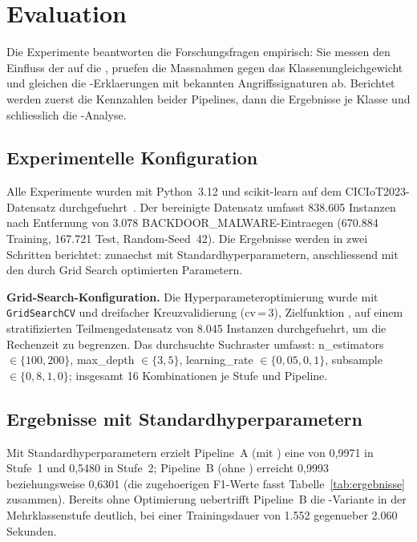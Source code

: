 \section{Evaluation}\label{evaluation}

Die Experimente beantworten die Forschungsfragen empirisch: Sie messen den Einfluss der \pca{}
auf die \ba{}, pruefen die Massnahmen gegen das Klassenungleichgewicht und gleichen die
\shap{}-Erklaerungen mit bekannten Angriffssignaturen ab.
Berichtet werden zuerst die Kennzahlen beider Pipelines, dann die Ergebnisse je Klasse und
schliesslich die \shap{}-Analyse.

\subsection{Experimentelle Konfiguration}

Alle Experimente wurden mit Python~3.12 und scikit-learn auf dem CICIoT2023-Datensatz
durchgefuehrt~\cite{neto2023ciciot2023}.
Der bereinigte Datensatz umfasst 838.605 Instanzen nach Entfernung von 3.078
BACKDOOR\_MALWARE-Eintraegen (670.884 Training, 167.721 Test, Random-Seed~42).
Die Ergebnisse werden in zwei Schritten berichtet: zunaechst mit Standardhyperparametern,
anschliessend mit den durch Grid Search optimierten Parametern.

\textbf{Grid-Search-Konfiguration.}
Die Hyperparameteroptimierung wurde mit \texttt{GridSearchCV} und dreifacher Kreuzvalidierung
(cv\,=\,3), Zielfunktion \ba{}, auf einem stratifizierten Teilmengedatensatz von 8.045 Instanzen
durchgefuehrt, um die Rechenzeit zu begrenzen.
Das durchsuchte Suchraster umfasst: n\_estimators $\in \{100, 200\}$,
max\_depth $\in \{3, 5\}$, learning\_rate $\in \{0{,}05, 0{,}1\}$,
subsample $\in \{0{,}8, 1{,}0\}$; insgesamt 16 Kombinationen je Stufe und Pipeline.

\subsection{Ergebnisse mit Standardhyperparametern}

Mit Standardhyperparametern erzielt Pipeline~A (mit \pca{}) eine \ba{} von 0{,}9971 in
Stufe~1 und 0{,}5480 in Stufe~2; Pipeline~B (ohne \pca{}) erreicht 0{,}9993 beziehungsweise
0{,}6301 (die zugehoerigen F1-Werte fasst Tabelle~\ref{tab:ergebnisse} zusammen).
Bereits ohne Optimierung uebertrifft Pipeline~B die \pca{}-Variante in der Mehrklassenstufe
deutlich, bei einer Trainingsdauer von 1.552 gegenueber 2.060 Sekunden.

